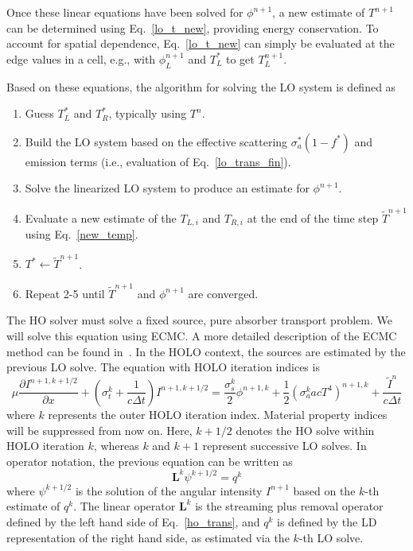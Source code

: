 \documentclass{mc2013}
\newcommand{\pderiv}[2]{\frac{\partial #1}{\partial #2}}
\newcommand{\B}[1]{\ensuremath{\mathbf{#1}}}
\begin{document}
Once these linear equations have been solved for $\phi^{n+1}$, a new estimate of
$T^{n+1}$ can be determined using Eq.~\eqref{lo_t_new}, providing energy
conservation.  To account for spatial dependence, Eq.~\eqref{lo_t_new} can simply be evaluated
at the edge values in a cell, e.g., with $\phi^{n+1}_L$ and $T^*_L$ to get $T_L^{n+1}$.

Based on these equations, the algorithm for solving the LO system is defined as
\begin{enumerate}
    \item Guess $T^*_L$ and $T^*_R$, typically using $T^n$.
    \item  Build the LO system based on the effective scattering $\sigma_a^*(1-f^*)$ and emission terms
        (i.e., evaluation of  Eq.~\eqref{lo_trans_fin}).
    \item Solve the linearized LO system to produce an estimate for $\phi^{n+1}$.
    \item Evaluate a new estimate of the $T_{L,i}$ and $T_{R,i}$ at the end of the time step
    $\tilde{T}^{n+1}$ using Eq.~\eqref{new_temp}.
    \item $T^*\leftarrow\tilde{T}^{n+1}$.
    \item Repeat 2-5 until $\tilde T^{n+1}$ and $\phi^{n+1}$ are converged.
\end{enumerate}


The HO solver must solve a fixed source, pure absorber transport
problem.  We will solve this equation using ECMC. A more detailed description of the
ECMC method can be found in~\cite{jake_thesis}. In the
HOLO context, the sources are estimated by the previous LO solve.
The equation with HOLO iteration indices is
\begin{equation}
\mu \pderiv{I^{n+1,k+1/2}}{x} + \left(\sigma_t^k + \frac{1}{c \Delta t }\right)
I^{n+1,k+1/2}
= \frac{\sigma_s^k}{2} \phi^{n+1,k} +\frac{1}{2} \left(\sigma_a^k a c T^4
\right)^{n+1,k} + \frac{\tilde I^n}{c\Delta t} 
\end{equation}
where $k$ represents the outer HOLO iteration index.  Material property indices will be
suppressed from now on.  Here, $k+1/2$ denotes the
HO solve within HOLO iteration $k$, whereas $k$ and $k+1$ represent successive LO
solves.  In operator notation, the previous equation can be written as
\begin{equation}\label{te_oper}
\B L^k \psi^{k+1/2}  = q^{k}
\end{equation}
where $\psi^{k+1/2}$ is the solution of the angular intensity $I^{n+1}$ based on the $k$-th
estimate of $q^k$.
The linear operator $\B L^k$ is the streaming plus
removal operator defined by the left hand
side of Eq.~\eqref{ho_trans}, and $q^k$ is defined by the LD representation of the
right hand side, as estimated via the $k$-th LO solve.  
\end{document}
